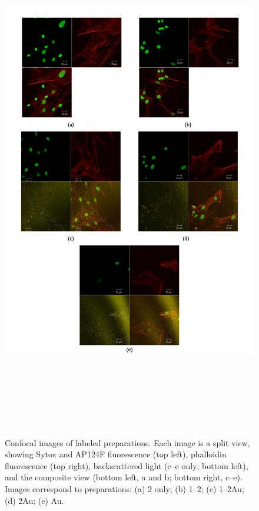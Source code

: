 \begin{figure}[p]
\centering
\includegraphics[keepaspectratio,width=\textwidth,height=9in]{ConfocalReps.pdf}
\caption{Confocal images of labeled preparations. Each image is a split view, showing Sytox and AP124F fluorescence (top left), phalloidin fluorescence (top right), backscattered light (c--e only; bottom left), and the composite view (bottom left, a and b; bottom right, c--e). Images correspond to preparations: (a) 2 only; (b) 1--2; (c) 1--2Au; (d) 2Au; (e) Au.}
\label{confocalcollage}
\end{figure}


